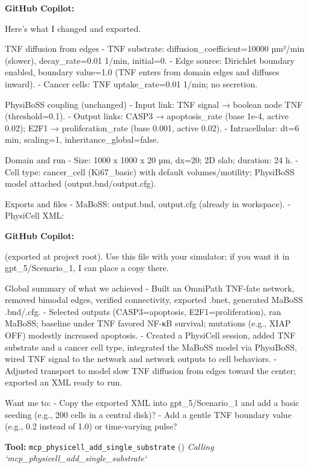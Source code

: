 \documentclass[11pt,a4paper]{article}
\begin{document}
\begin{copilotbox}
\textbf{GitHub Copilot:}

Here’s what I changed and exported.

TNF diffusion from edges
- TNF substrate: diffusion\_coefficient=10000 µm²/min (slower), decay\_rate=0.01 1/min, initial=0.
- Edge source: Dirichlet boundary enabled, boundary value=1.0 (TNF enters from domain edges and diffuses inward).
- Cancer cells: TNF uptake\_rate=0.01 1/min; no secretion.

PhysiBoSS coupling (unchanged)
- Input link: TNF signal → boolean node TNF (threshold=0.1).
- Output links: CASP3 → apoptosis\_rate (base 1e-4, active 0.02); E2F1 → proliferation\_rate (base 0.001, active 0.02).
- Intracellular: dt=6 min, scaling=1, inheritance\_global=false.

Domain and run
- Size: 1000 x 1000 x 20 µm, dx=20; 2D slab; duration: 24 h.
- Cell type: cancer\_cell (Ki67\_basic) with default volumes/motility; PhysiBoSS model attached (output.bnd/output.cfg).

Exports and files
- MaBoSS: output.bnd, output.cfg (already in workspace).
- PhysiCell XML:

\end{copilotbox}
\begin{copilotbox}
\textbf{GitHub Copilot:}

(exported at project root). Use this file with your simulator; if you want it in gpt\_5/Scenario\_1, I can place a copy there.

Global summary of what we achieved
- Built an OmniPath TNF-fate network, removed bimodal edges, verified connectivity, exported .bnet, generated MaBoSS .bnd/.cfg.
- Selected outputs (CASP3=apoptosis, E2F1=proliferation), ran MaBoSS; baseline under TNF favored NF-κB survival; mutations (e.g., XIAP OFF) modestly increased apoptosis.
- Created a PhysiCell session, added TNF substrate and a cancer cell type, integrated the MaBoSS model via PhysiBoSS, wired TNF signal to the network and network outputs to cell behaviors.
- Adjusted transport to model slow TNF diffusion from edges toward the center; exported an XML ready to run.

Want me to:
- Copy the exported XML into gpt\_5/Scenario\_1 and add a basic seeding (e.g., 200 cells in a central disk)?
- Add a gentle TNF boundary value (e.g., 0.2 instead of 1.0) or time-varying pulse?

\end{copilotbox}
\begin{toolokbox}
\textbf{Tool:} \texttt{mcp\_physicell\_add\_single\_substrate} (\checkmark)
\textit{Calling `mcp\_physicell\_add\_single\_substrate`}
\end{toolokbox}
\end{document}
